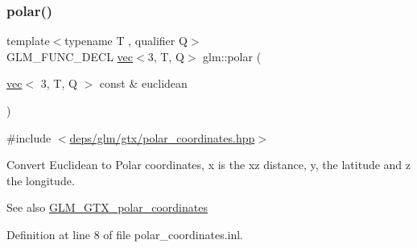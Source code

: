 \subsubsection{\texorpdfstring{polar()}{polar()}}
{\footnotesize\ttfamily template$<$typename T , qualifier Q$>$ \\
G\+L\+M\+\_\+\+F\+U\+N\+C\+\_\+\+D\+E\+CL \hyperlink{structglm_1_1vec}{vec}$<$3, T, Q$>$ glm\+::polar (\begin{DoxyParamCaption}\item[{\hyperlink{structglm_1_1vec}{vec}$<$ 3, T, Q $>$ const \&}]{euclidean }\end{DoxyParamCaption})}



{\ttfamily \#include $<$\hyperlink{polar__coordinates_8hpp}{deps/glm/gtx/polar\+\_\+coordinates.\+hpp}$>$}

Convert Euclidean to Polar coordinates, x is the xz distance, y, the latitude and z the longitude.

\begin{DoxySeeAlso}{See also}
\hyperlink{group__gtx__polar__coordinates}{G\+L\+M\+\_\+\+G\+T\+X\+\_\+polar\+\_\+coordinates} 
\end{DoxySeeAlso}


Definition at line 8 of file polar\+\_\+coordinates.\+inl.

